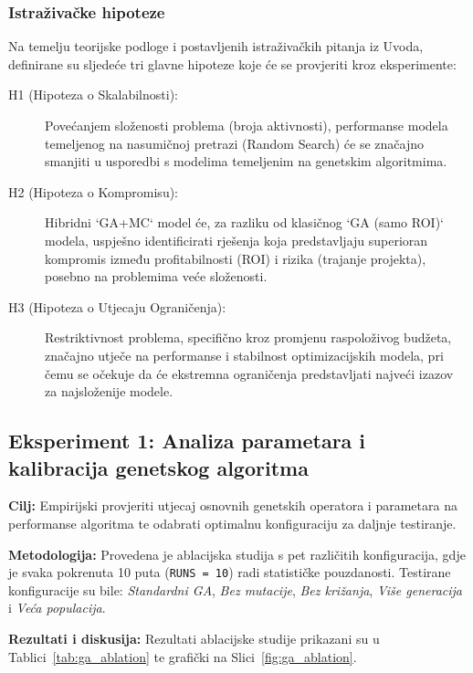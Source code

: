 \subsubsection{Istraživačke hipoteze}
Na temelju teorijske podloge i postavljenih istraživačkih pitanja iz Uvoda, definirane su sljedeće tri glavne hipoteze koje će se provjeriti kroz eksperimente:

\begin{description}
    \item[H1 (Hipoteza o Skalabilnosti):] Povećanjem složenosti problema (broja aktivnosti), performanse modela temeljenog na nasumičnoj pretrazi (Random Search) će se značajno smanjiti u usporedbi s modelima temeljenim na genetskim algoritmima.
    \item[H2 (Hipoteza o Kompromisu):] Hibridni `GA+MC` model će, za razliku od klasičnog `GA (samo ROI)` modela, uspješno identificirati rješenja koja predstavljaju superioran kompromis između profitabilnosti (ROI) i rizika (trajanje projekta), posebno na problemima veće složenosti.
    \item[H3 (Hipoteza o Utjecaju Ograničenja):] Restriktivnost problema, specifično kroz promjenu raspoloživog budžeta, značajno utječe na performanse i stabilnost optimizacijskih modela, pri čemu se očekuje da će ekstremna ograničenja predstavljati najveći izazov za najsloženije modele.
\end{description}

\subsection{Eksperiment 1: Analiza parametara i kalibracija genetskog algoritma}

\textbf{Cilj:} Empirijski provjeriti utjecaj osnovnih genetskih operatora i parametara na performanse algoritma te odabrati optimalnu konfiguraciju za daljnje testiranje.

\textbf{Metodologija:} Provedena je ablacijska studija s pet različitih konfiguracija, gdje je svaka pokrenuta 10 puta (\texttt{RUNS = 10}) radi statističke pouzdanosti. Testirane konfiguracije su bile: \emph{Standardni GA}, \emph{Bez mutacije}, \emph{Bez križanja}, \emph{Više generacija} i \emph{Veća populacija}.

\textbf{Rezultati i diskusija:} Rezultati ablacijske studije prikazani su u Tablici~\ref{tab:ga_ablation} te grafički na Slici~\ref{fig:ga_ablation}.

